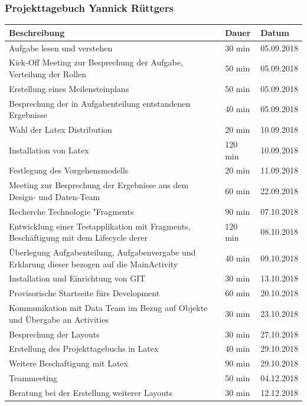 \newpage
\subsubsection{Projekttagebuch Yannick Rüttgers}
\begin{longtable}{|p{10cm}|p{2cm}|p{2cm}|}
\hline
{\textbf{Beschreibung}} & {\textbf{Dauer}} & {\textbf{Datum}} \\ \hline
Aufgabe lesen und verstehen & 30 min & 05.09.2018\\ \hline 
Kick-Off Meeting zur Besprechung der Aufgabe, Verteilung der Rollen & 50 min & 05.09.2018\\ \hline 
Erstellung eines Meilensteinplans & 50 min & 05.09.2018\\ \hline 
Besprechung der in Aufgabenteilung entstandenen Ergebnisse & 40 min & 05.09.2018\\ \hline 
Wahl der Latex Distribution & 20 min & 10.09.2018\\ \hline 
Installation von Latex & 120 min & 10.09.2018\\ \hline 
Festlegung des Vorgehensmodells & 20 min & 11.09.2018\\ \hline 
Meeting zur Besprechung der Ergebnisse aus dem Design- und Daten-Team & 60 min & 22.09.2018\\ \hline 
Recherche Technologie "Fragments & 90 min & 07.10.2018\\ \hline 
Entwicklung einer Testapplikation mit Fragments, Beschäftigung mit dem Lifecycle derer & 120 min & 08.10.2018\\ \hline 
Überlegung Aufgabenteilung, Aufgabenvergabe und Erklarung dieser bezogen auf die MainActivity & 40 min & 09.10.2018\\ \hline 
Installation und Einrichtung von GIT & 30 min & 13.10.2018\\ \hline 
Provisorische Startseite fürs Development & 60 min & 20.10.2018\\ \hline 
Kommunikation mit Data Team im Bezug auf Objekte und Übergabe an Activities & 30 min & 23.10.2018\\ \hline 
Besprechung der Layouts & 30 min & 27.10.2018\\ \hline 
Erstellung des Projekttagebuchs in Latex & 40 min & 29.10.2018\\ \hline 
Weitere Beschaftigung mit Latex & 90 min & 29.10.2018\\ \hline 
Teammeeting & 50 min & 04.12.2018\\ \hline 
Beratung bei der Erstellung weiterer Layouts & 30 min & 12.12.2018\\ \hline 

\end{longtable}
